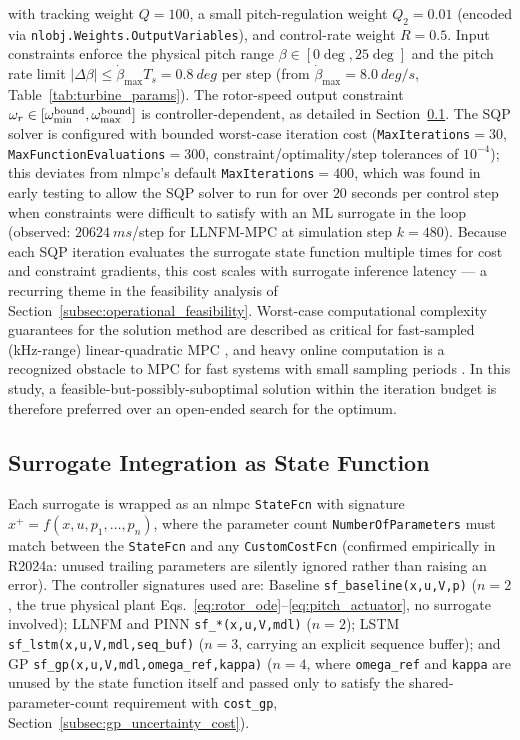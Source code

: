 with tracking weight $Q=100$, a small pitch-regulation weight
$Q_2=0.01$ (encoded via \texttt{nlobj.Weights.OutputVariables}), and
control-rate weight $R=0.5$. Input constraints enforce the physical pitch
range $\beta \in [0\deg,25\deg]$ and the pitch rate limit
$|\Delta\beta| \le \dot\beta_{\max} T_s = \SI{0.8}{deg}$ per step
(from $\dot\beta_{\max}=\SI{8.0}{deg/s}$, Table~\ref{tab:turbine_params}).
The rotor-speed output constraint $\omega_r \in [\omega_{\min}^{\text{bound}},
\omega_{\max}^{\text{bound}}]$ is controller-dependent, as detailed in
Section~\ref{subsec:surrogate_integration}. The SQP solver is configured
with bounded worst-case iteration cost
(\texttt{MaxIterations}$=30$, \texttt{MaxFunctionEvaluations}$=300$,
constraint/optimality/step tolerances of $10^{-4}$); this deviates from
nlmpc's default \texttt{MaxIterations}$=400$, which was found in early
testing to allow the SQP solver to run for over $20$ seconds per control
step when constraints were difficult to satisfy with an ML surrogate in
the loop (observed: $\SI{20624}{ms}$/step for LLNFM-MPC at simulation step
$k=480$). Because each SQP iteration evaluates the surrogate state
function multiple times for cost and constraint gradients, this cost
scales with surrogate inference latency — a recurring theme in the
feasibility analysis of Section~\ref{subsec:operational_feasibility}. {\color{auditP2}Worst-case computational complexity guarantees for the solution method
are described as critical for fast-sampled (kHz-range) linear-quadratic
MPC \cite{richter2012}, and heavy online computation is a recognized
obstacle to MPC for fast systems with small sampling periods
\cite{xi2013}. In this study, a
feasible-but-possibly-suboptimal solution within the iteration budget is
therefore preferred over an open-ended search for the optimum.}

\subsection{Surrogate Integration as State Function}
\label{subsec:surrogate_integration}

Each surrogate is wrapped as an nlmpc \texttt{StateFcn} with signature
$x^{+} = f(x,u,p_1,\ldots,p_n)$, where the parameter count
\texttt{NumberOfParameters} must match between the \texttt{StateFcn} and
any \texttt{CustomCostFcn} (confirmed empirically in R2024a: unused
trailing parameters are silently ignored rather than raising an error).
The controller signatures used are: Baseline
\texttt{sf\_baseline(x,u,V,p)} ($n=2$, the true physical plant
Eqs.~\eqref{eq:rotor_ode}--\eqref{eq:pitch_actuator}, no surrogate
involved); LLNFM and PINN \texttt{sf\_*(x,u,V,mdl)} ($n=2$); LSTM
\texttt{sf\_lstm(x,u,V,mdl,seq\_buf)} ($n=3$, carrying an explicit sequence
buffer); and GP \texttt{sf\_gp(x,u,V,mdl,omega\_ref,kappa)} ($n=4$, where
\texttt{omega\_ref} and \texttt{kappa} are unused by the state function
itself and passed only to satisfy the shared-parameter-count requirement
with \texttt{cost\_gp}, Section~\ref{subsec:gp_uncertainty_cost}).

